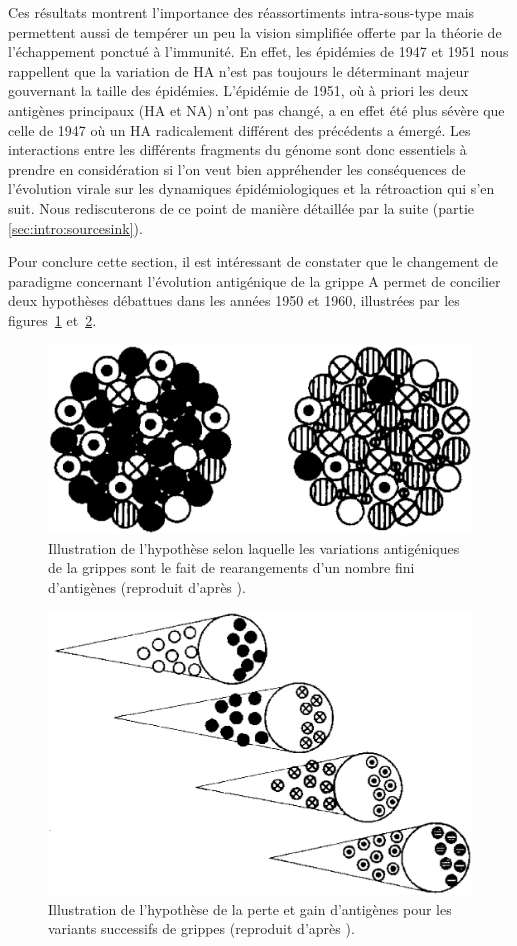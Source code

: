Ces résultats montrent l'importance des réassortiments intra-sous-type
mais permettent aussi de tempérer un peu la vision simplifiée offerte
par la théorie de l'échappement ponctué à l'immunité. En effet, les
épidémies de 1947 et 1951 nous rappellent que la variation de HA n'est
pas toujours le déterminant majeur gouvernant la taille des épidémies.
L'épidémie de 1951, où à priori les deux antigènes principaux (HA et
NA) n'ont pas changé, a en effet été plus sévère que celle de 1947 où
un HA radicalement différent des précédents a émergé. Les interactions
entre les différents fragments du génome sont donc essentiels à
prendre en considération si l'on veut bien appréhender les
conséquences de l'évolution virale sur les dynamiques épidémiologiques
et la rétroaction qui s'en suit. Nous rediscuterons de ce point de
manière détaillée par la suite (partie \ref{sec:intro:sourcesink}).

Pour conclure cette section, il est intéressant de constater que le
changement de paradigme concernant l'évolution antigénique de la
grippe A permet de concilier deux hypothèses débattues dans les années
1950 et 1960, illustrées par les figures~\ref{fig:intro:francis1}
et~\ref{fig:intro:francis2}.

\begin{figure}[!htbp]
  \begin{center}
    \includegraphics[width=0.5\linewidth]{graphs/intro/francis1.eps}
  \end{center}
  \caption{Illustration de l'hypothèse selon laquelle les variations
    antigéniques de la grippes sont le fait de rearangements d'un
    nombre fini d'antigènes (reproduit d'après \citet{Francis1960}).}
  \label{fig:intro:francis1}
\end{figure}

\begin{figure}[!htbp]
  \begin{center}
    \includegraphics[width=0.5\linewidth]{graphs/intro/francis2.eps}
  \end{center}
  \caption{Illustration de l'hypothèse de la perte et gain d'antigènes
    pour les variants successifs de grippes (reproduit d'après
    \citet{Francis1960}).}
  \label{fig:intro:francis2}
\end{figure}


